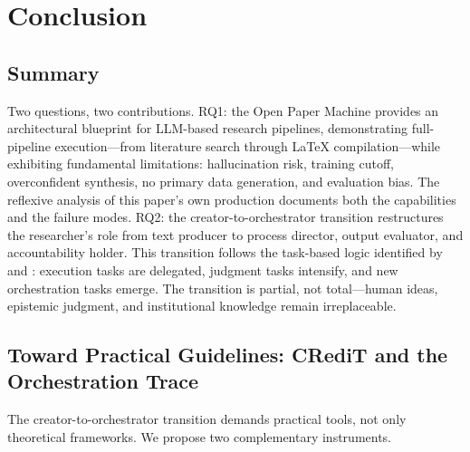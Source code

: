 \documentclass{article}
\begin{document}




\section{Conclusion}
\label{sec:conclusion}

\subsection{Summary}

Two questions, two contributions. RQ1: the Open Paper Machine provides an architectural blueprint for LLM-based research pipelines, demonstrating full-pipeline execution---from literature search through \LaTeX{} compilation---while exhibiting fundamental limitations: hallucination risk, training cutoff, overconfident synthesis, no primary data generation, and evaluation bias. The reflexive analysis of this paper's own production documents both the capabilities and the failure modes. RQ2: the creator-to-orchestrator transition restructures the researcher's role from text producer to process director, output evaluator, and accountability holder. This transition follows the task-based logic identified by \citet{autor2015why} and \citet{acemoglu2018automation}: execution tasks are delegated, judgment tasks intensify, and new orchestration tasks emerge. The transition is partial, not total---human ideas, epistemic judgment, and institutional knowledge remain irreplaceable.

\subsection{Toward Practical Guidelines: CRediT and the Orchestration Trace}

The creator-to-orchestrator transition demands practical tools, not only theoretical frameworks. We propose two complementary instruments.
\end{document}
